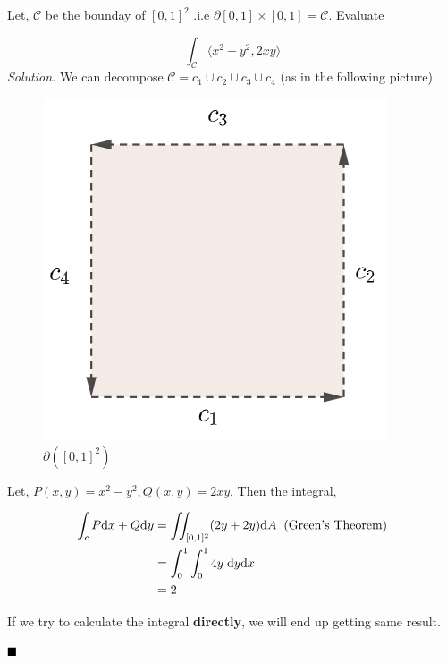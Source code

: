 \documentclass[../Analysis-3]{subfiles}
\begin{document}
\begin{Eg}{}{}
    Let, $\mathcal{C}$ be the bounday of $[0,1]^2$ .i.e $\partial [0,1]\times[0,1] = \mathcal{C}$. Evaluate

    \[\int_{\mathcal{C}} \langle x^2-y^2,2xy \rangle\]
    \textit{Solution.} We can decompose $\mathcal{C} = c_1 \cup c_2 \cup c_3 \cup c_4$ (as in the following picture)

    \begin{figure}
        \centering
        \includegraphics[width=.78\linewidth]{../figures/lec-28.2.png}
        \caption{$\partial( [0,1]^2)$}
    \end{figure}

    Let, $P(x,y) = x^2 - y^2, Q(x,y) = 2xy$. Then the integral,

    \begin{align*}
        \int_c P \dd x + Q \dd y & = \iint_{[0,1]^2} (2y + 2y) \dd A \hspace{0.2cm} \text{(Green's Theorem)} \\
                                 & = \int_{0}^1 \int_0^1 4y \hspace{0.1cm} \dd y \dd x                       \\
                                 & = 2
    \end{align*}

    If we try to calculate the integral \textbf{directly}, we will end up getting same result.

    $\hfill \blacksquare$
\end{Eg}
\end{document}
